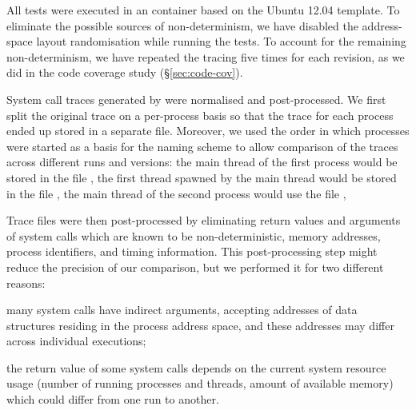 All tests were executed in an \lxc container based on the Ubuntu 12.04
template.  To eliminate the possible sources of non-determinism, we have
disabled the address-space layout randomisation while running the tests. To
account for the remaining non-determinism, we have repeated the tracing five
times for each revision, as we did in the code coverage
study (\S\ref{sec:code-cov}).

System call traces generated by  were normalised and
post-processed. We first split the original trace on a per-process basis so
that the trace for each process ended up stored in a separate file.
Moreover, we used the order in which processes were started as a basis for the
naming scheme to allow comparison of the traces across different runs and
versions: the main thread of the first process would be stored in the file
, the first thread spawned by the main thread would be
stored in the file , the main thread of the second
process would use the file , \etc


Trace files were then post-processed by eliminating return values and arguments
of system calls which are known to be non-deterministic, \ie memory addresses,
process identifiers, and timing information. This post-processing step
might reduce the precision of our comparison, but we performed it for two
different reasons:%
\begin{inparaenum}[(1)]
\item many system calls have indirect arguments, accepting addresses of data
  structures residing in the process address space, and these addresses may
  differ across individual executions;
\item the return value of some system calls depends on the current system
  resource usage (\eg number of running processes and threads, amount of
  available memory) which could differ from one run to another.
\end{inparaenum}

